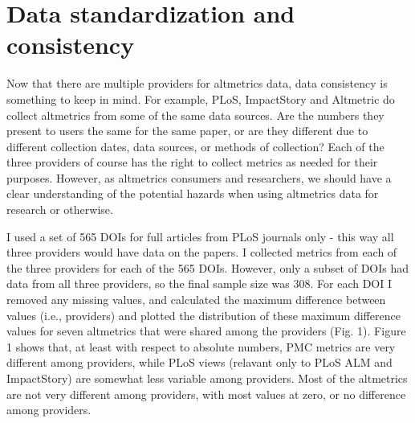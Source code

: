 \documentclass[letterpaper,superscriptaddress,showkeys,longbibliography]{revtex4-1}\usepackage{graphicx, color}
\begin{document}
\section*{Data standardization and consistency}

Now that there are multiple providers for altmetrics data, data consistency is something to keep in mind. For example, PLoS, ImpactStory and Altmetric do collect altmetrics from some of the same data sources. Are the numbers they present to users the same for the same paper, or are they different due to different collection dates, data sources, or methods of collection? Each of the three providers of course has the right to collect metrics as needed for their purposes. However, as altmetrics consumers and researchers, we should have a clear understanding of the potential hazards when using altmetrics data for research or otherwise. 

I used a set of 565 DOIs for full articles from PLoS journals only - this way all three providers would have data on the papers. I collected metrics from each of the three providers for each of the 565 DOIs. However, only a subset of DOIs had data from all three providers, so the final sample size was 308. For each DOI I removed any missing values, and calculated the maximum difference between values (i.e., providers) and plotted the distribution of these maximum difference values for seven altmetrics that were shared among the providers (Fig. 1). Figure 1 shows that, at least with respect to absolute numbers, PMC metrics are very different among providers, while PLoS views (relavant only to PLoS ALM and ImpactStory) are somewhat less variable among providers. Most of the altmetrics are not very different among providers, with most values at zero, or no difference among providers. 




\end{document}
